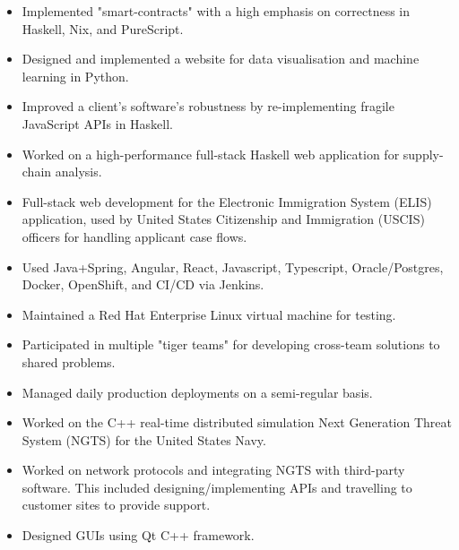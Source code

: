 \documentclass[10pt,a4paper,ragged2e,withhyper]{custom}
\begin{document}
\begin{paracol}{2}
\divider


\begin{itemize}
    \item Implemented "smart-contracts" with a high emphasis on correctness in Haskell, Nix, and PureScript.
    \item Designed and implemented a website for data visualisation and machine learning in Python.
    \item Improved a client's software's robustness by re-implementing fragile JavaScript APIs in Haskell.
    \item Worked on a high-performance full-stack Haskell web application for supply-chain analysis.
\end{itemize}

\divider


\begin{itemize}
    \item Full-stack web development for the Electronic Immigration System (ELIS) application, used by United States Citizenship and Immigration (USCIS) officers for handling applicant case flows.
    \item Used Java+Spring, Angular, React, Javascript, Typescript, Oracle/Postgres, Docker, OpenShift, and CI/CD via Jenkins.
    \item Maintained a Red Hat Enterprise Linux virtual machine for testing.
    \item Participated in multiple "tiger teams" for developing cross-team solutions to shared problems.
    \item Managed daily production deployments on a semi-regular basis.
\end{itemize}

\divider

\begin{itemize}
  \item Worked on the C++ real-time distributed simulation Next Generation Threat System (NGTS) for the United States Navy.
  \item Worked on network protocols and integrating NGTS with third-party software. This included designing/implementing APIs and travelling to customer sites to provide support.
  \item Designed GUIs using Qt C++ framework.
\end{itemize}

\end{paracol}
\end{document}
